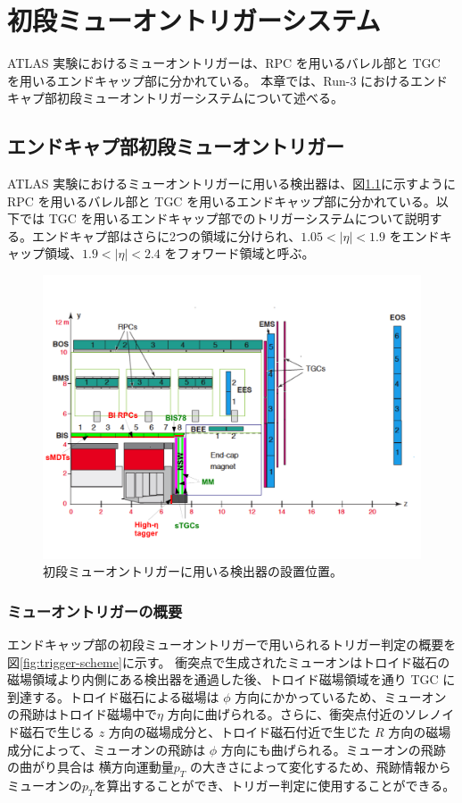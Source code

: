 \chapter{初段ミューオントリガーシステム}
ATLAS 実験におけるミューオントリガーは、RPC を用いるバレル部と TGC を用いるエンドキャップ部に分かれている。
本章では、Run-3 におけるエンドキャプ部初段ミューオントリガーシステムについて述べる。

\section{エンドキャプ部初段ミューオントリガー}
ATLAS 実験におけるミューオントリガーに用いる検出器は、図\ref{fig:muon}に示すように RPC を用いるバレル部と TGC を用いるエンドキャップ部に分かれている。以下では TGC を用いるエンドキャップ部でのトリガーシステムについて説明する。エンドキャプ部はさらに2つの領域に分けられ、$1.05 < |\eta| < 1.9$ をエンドキャップ領域、$1.9 < |\eta| < 2.4$ をフォワード領域と呼ぶ。
\begin{figure}[tb]
  \centering
  \includegraphics[clip, width=14cm]{fig/2/ch01_fig_03a.pdf}
  \caption{初段ミューオントリガーに用いる検出器の設置位置。}
  \label{fig:muon}
\end{figure}

\subsection{ミューオントリガーの概要}\label{section:CW}
エンドキャップ部の初段ミューオントリガーで用いられるトリガー判定の概要を図\ref{fig:trigger-scheme}に示す。
衝突点で生成されたミューオンはトロイド磁石の磁場領域より内側にある検出器を通過した後、トロイド磁場領域を通り TGC に到達する。トロイド磁石による磁場は $\phi$ 方向にかかっているため、ミューオンの飛跡はトロイド磁場中で$\eta$ 方向に曲げられる。さらに、衝突点付近のソレノイド磁石で生じる $z$ 方向の磁場成分と、トロイド磁石付近で生じた $R$ 方向の磁場成分によって、ミューオンの飛跡は $\phi$ 方向にも曲げられる。ミューオンの飛跡の曲がり具合は 横方向運動量$p_T$ の大きさによって変化するため、飛跡情報からミューオンの$p_T$を算出することができ、トリガー判定に使用することができる。

